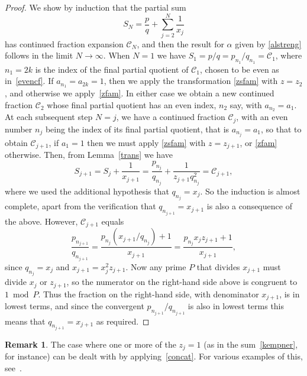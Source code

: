 \documentclass[10pt, a4paper]{amsart}
\numberwithin{equation}{section}
\newcommand\al{{\alpha}}
\theoremstyle{plain}
\theoremstyle{definition}
\newtheorem{rem}[thm]{Remark}
\begin{document}
\begin{proof} 
We show by induction 
that the partial sum 
\[ 
S_N = \frac{p}{q}+\sum_{j=2}^N \frac{1}{x_j}
\] 
has continued fraction expansion $\mathcal{C}_N$, 
and then the result for $\al$ given by \eqref{alstreng} 
follows in the limit $N\to\infty$. 
When $N=1$ we have 
$
S_1=%
p/q=p_{n_1}/q_{n_1}=\mathcal{C}_1
$,
where $n_1=2k$ is the index of the final 
partial quotient of $\mathcal{C}_1$, chosen to be even 
as in~\eqref{evencf}. 
If $a_{n_1}=a_{2k}=1$, then we apply 
the transformation \eqref{zsfam} with $z=z_2$, 
and otherwise we apply~\eqref{zfam}. 
In either case we obtain a new continued fraction 
$\mathcal{C}_2$ whose final partial quotient has an even index, 
$n_2$ say, with $a_{n_2}=a_1$. 
 At each subsequent step $N=j$, 
we have a continued fraction $\mathcal{C}_j$, 
with an even number $n_j$ being the index 
of its final partial quotient, that is $a_{n_j}=a_1$, 
so that to obtain  $\mathcal{C}_{j+1}$,  if $a_1=1$ then
we must apply \eqref{zsfam} with $z=z_{j+1}$, 
or \eqref{zfam} otherwise. 
Then, from Lemma~\ref{trans} we have
\[ 
S_{j+1}=S_j+\frac{1}{x_{j+1}}
= \frac{p_{n_j}}{q_{n_j}}+\frac{1}{z_{j+1}q_{n_j}^2}
= \mathcal{C}_{j+1},
\]
where  we used the additional hypothesis that $q_{n_j}=x_j$.  
So the 
induction is almost complete, apart from the verification that 
$q_{n_{j+1}}=x_{j+1}$ is also a consequence of the above. However,  
$\mathcal{C}_{j+1}$ equals 
\[ 
\frac{p_{n_{j+1}}}{q_{n_{j+1}}} = \frac{ p_{n_j} (x_{j+1}/q_{n_j})+1}
{x_{j+1}} =\frac{p_{n_j}x_jz_{j+1}+1}{x_{j+1}}, 
\] 
since $q_{n_j}=x_j$ and  $x_{j+1}=x_j^2z_{j+1}$. 
Now any prime $P$ that divides $x_{j+1}$ must divide 
$x_j$ or $z_{j+1}$, so  the numerator on the right-hand side above is 
congruent to $1\bmod P$. Thus the fraction on the right-hand side, 
with denominator $x_{j+1}$, is in lowest terms, 
and since the convergent  $p_{n_{j+1}}/q_{n_{j+1}}$ 
is also in lowest terms this means that $q_{n_{j+1}}=x_{j+1}$ as required. 
\end{proof} 

\begin{rem}
The case where one or more of the $z_j=1$  (as in the sum~\eqref{kempner}, 
for instance) can be dealt with 
by applying~\eqref{concat}. For various examples of this, see~\cite{Hone2}. 
\end{rem}
\end{document}
